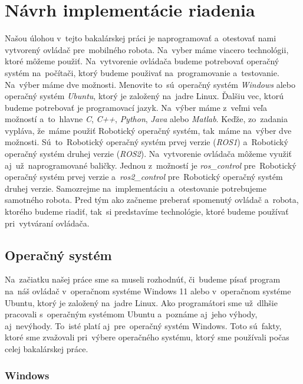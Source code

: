 \section{Návrh implementácie riadenia}
\label{sec:technologies}

Našou úlohou v~tejto bakalárskej práci je naprogramovať a~otestovať nami vytvorený ovládač pre~mobilného
robota. Na~vyber máme viacero technológii, ktoré môžeme použiť. Na~vytvorenie ovládača budeme potrebovať
operačný systém na~počítači, ktorý budeme použivať na~programovanie a~testovanie. Na~výber máme dve možnosti.
Menovite to~sú~operačný systém \textit{Windows} alebo operačný systém \textit{Ubuntu}, ktorý je založený
na~jadre Linux. Ďalšiu vec, ktorú budeme potrebovať je programovací jazyk. Na~výber máme z~veľmi veľa
možností a~to~hlavne \textit{C}, \textit{C++}, \textit{Python}, \textit{Java} alebo \textit{Matlab}.
Keďže, zo~zadania vypláva, že~máme použiť Robotický operačný systém, tak~máme na~výber dve možnosti.
Sú~to~Robotický operačný systém prvej verzie (\textit{ROS1}) a~Robotický operačný systém druhej verzie
(\textit{ROS2}). Na~vytvorenie ovládača môžeme využiť aj~už~naprogramované baličky. Jednou z~možností
je \textit{ros\_control} pre~Robotický operačný systém prvej verzie a~\textit{ros2\_control} pre~Robotický
operačný systém druhej verzie. Samozrejme na~implementáciu a~otestovanie potrebujeme samotného robota.
Pred tým ako začneme preberať spomenutý ovládač a~robota, ktorého budeme riadiť, tak~si predstavíme
technológie, ktoré budeme používať pri~vytváraní ovládača.

\subsection{Operačný systém}
\label{sec:operating_system}

Na~začiatku našej práce sme sa museli rozhodnúť, či~budeme písať program na~náš ovládač v~operačnom systéme Windows 11 alebo
v~operačnom systéme Ubuntu, ktorý je založený na~jadre Linux. Ako programátori sme už~dlhšie pracovali s~operačným systémom
Ubuntu a~poznáme aj~jeho výhody, aj~nevýhody. To~isté platí aj~pre~operačný systém Windows. Toto sú~fakty, ktoré sme zvažovali
pri~výbere operačného systému, ktorý sme používali počas celej bakalárskej práce.

\subsubsection{Windows}
\label{sec:windows}


